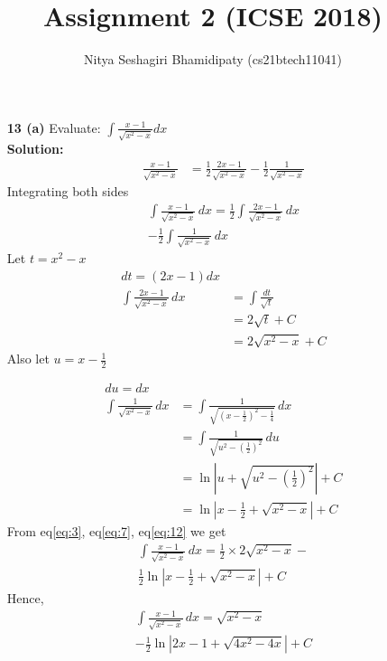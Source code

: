 \documentclass[journal,12pt,two column]{IEEEtran}
\title{Assignment 2 (ICSE 2018)}
\author{Nitya Seshagiri Bhamidipaty (cs21btech11041)}
\providecommand{\brak}[1]{\ensuremath{\left(#1\right)}}
\newcommand{\solution}{\noindent \textbf{Solution: }}
\begin{document}
\maketitle
\begin{enumerate}
\item[\textbf{13 (a)}] Evaluate: $\int\frac{x-1}{\sqrt{x^2-x}}dx$\\
\solution 
\begin{align}
    \frac{x-1}{\sqrt{x^2-x}} %
    &= \frac{1}{2}\frac{2x-1}{\sqrt{x^2-x}} - \frac{1}{2}\frac{1}{\sqrt{x^2-x}}
\end{align}
Integrating both sides
\begin{multline}
\int \frac{x-1}{\sqrt{x^2-x}} \, dx = \frac{1}{2}\int\frac{2x-1}{\sqrt{x^2-x}} \, dx \\
    -  \frac{1}{2}\int\frac{1}{\sqrt{x^2-x}} \, dx
    \label{eq:3}
\end{multline}
Let $t = x^2-x$
\begin{align}
    dt = (2x - 1)dx
    \\
    \int\frac{2x-1}{\sqrt{x^2-x}} \, dx &= \int\frac{dt}{\sqrt{t}}
    \\
    &= 2\sqrt{t}+C
    \\
    &= 2\sqrt{x^2-x}+C
    \label{eq:7}
\end{align}
Also let $u = x - \frac{1}{2}$

\begin{align}
    du = dx\\
    \int\frac{1}{\sqrt{x^2-x}} \, dx &= \int\frac{1}{\sqrt{\brak{x-\frac{1}{2}}^2 - \frac{1}{4}}} \, dx
    \\
    &=\int\frac{1}{\sqrt{u^2 - \brak{\frac{1}{2}}^2}} \, du
    \\
    &= \ln \left|u + \sqrt{u^2-\brak{\frac{1}{2}}^2}\right| + C
    \\
    &= \ln \left|x - \frac{1}{2} + \sqrt{x^2-x}\right|+C
    \label{eq:12}
\end{align}
From eq\eqref{eq:3}, eq\eqref{eq:7}, eq\eqref{eq:12} we get 
\begin{multline}
    \int\frac{x-1}{\sqrt{x^2-x}} \, dx = \frac{1}{2}\times2\sqrt{x^2-x} -\\
    \frac{1}{2} \ln \left|x - \frac{1}{2} + \sqrt{x^2-x}\right| +C
\end{multline}
Hence,
\begin{multline}
    \int \frac{x-1}{\sqrt{x^2-x}} \, dx = \sqrt{x^2-x} \\- \frac{1}{2}\ln \left|2x-1 + \sqrt{4x^2-4x}\right| + C
\end{multline}

\end{enumerate}
\end{document}
